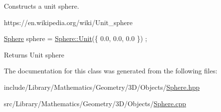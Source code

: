 Constructs a unit sphere. 

https\+://en.wikipedia.\+org/wiki/\+Unit\+\_\+sphere


\begin{DoxyCode}
\hyperlink{classlibrary_1_1math_1_1geom_1_1d3_1_1objects_1_1_sphere_a55dccc8ea16ee55cd7694c26afa8ea39}{Sphere} sphere = \hyperlink{classlibrary_1_1math_1_1geom_1_1d3_1_1objects_1_1_sphere_a5464ea9145425db63dedbd896d6c97b0}{Sphere::Unit}(\{ 0.0, 0.0, 0.0 \}) ;
\end{DoxyCode}


\begin{DoxyReturn}{Returns}
Unit sphere 
\end{DoxyReturn}


The documentation for this class was generated from the following files\+:\begin{DoxyCompactItemize}
\item 
include/\+Library/\+Mathematics/\+Geometry/3\+D/\+Objects/\hyperlink{_sphere_8hpp}{Sphere.\+hpp}\item 
src/\+Library/\+Mathematics/\+Geometry/3\+D/\+Objects/\hyperlink{_sphere_8cpp}{Sphere.\+cpp}\end{DoxyCompactItemize}
